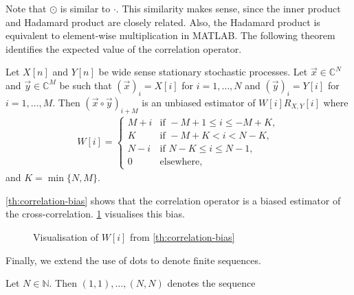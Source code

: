 \documentclass[a4paper, openany, oneside]{memoir}
\begin{document}
Note that $\odot$ is similar to $\cdot$. This similarity makes sense, since the inner product and Hadamard product are closely related. Also, the Hadamard product is equivalent to element-wise multiplication in MATLAB.
The following theorem identifies the expected value of the correlation operator.

\begin{blockTheorem} 
    Let $X[n]$ and $Y[n]$ be wide sense stationary stochastic processes. Let $\vec{x} \in \mathbb{C}^N$ and $\vec{y} \in \mathbb{C}^M$ be such that $(\vec{x})_i = X[i]$ for $i=1,\ldots,N$ and $(\vec{y})_i = Y[i]$ for $i=1,\ldots,M$.  Then $(\vec{x} \circ \vec{y})_{i+M}$ is an unbiased estimator of $W[i]R_{X,Y}[i]$ where
    \begin{align*}
        W[i] = \begin{cases}
            M + i & \text{if } -M + 1 \le i \le -M + K, \\
            K & \text{if } -M + K < i < N - K, \\
            N - i & \text{if } N - K \le i \le N - 1, \\
            0 & \text{elsewhere,}
        \end{cases}
    \end{align*}
    and $K = \min\{N,M\}$.
\end{blockTheorem}

\cref{th:correlation-bias} shows that the correlation operator is a biased estimator of the cross-correlation. \cref{fig:vis-wi} visualises this bias.

\begin{figure}
    \centering
    \caption{Visualisation of $W[i]$ from \cref{th:correlation-bias}}
    \label{fig:vis-wi}
\end{figure}

Finally, we extend the use of dots to denote finite sequences.

\begin{blockDefinition} 
    Let $N \in \mathbb{N}$. Then $(1,1),\ldots,(N,N)$ denotes the sequence

     \nolinebreak
\end{blockDefinition}
\end{document}
